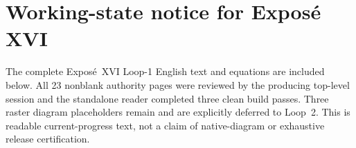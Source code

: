 \documentclass[11pt,a4paper,oneside]{book}
\begin{document}
\chapter*{Working-state notice for Expos\'e XVI}
The complete Expos\'e~XVI Loop-1 English text and equations are included
below. All 23 nonblank authority pages were reviewed by the producing
top-level session and the standalone reader completed three clean build
passes. Three raster diagram placeholders remain and are explicitly
deferred to Loop~2. This is readable current-progress text, not a claim
of native-diagram or exhaustive release certification.
\graphicspath{{xvi/}{figures/}{figures/exp7/}{assets/diagrams/}}






\end{document}
